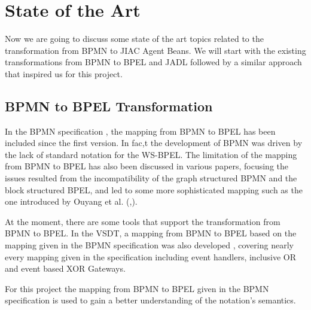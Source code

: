 \chapter{State of the Art}
\label{chap:sota}
Now we are going to discuss some state of the art topics related to the transformation from BPMN to JIAC Agent Beans. We will start with the existing transformations from BPMN to BPEL and JADL followed by a similar approach that inspired us for this project.
\section{BPMN to BPEL Transformation}
In the BPMN specification \cite{BPMN2}, the mapping from BPMN to BPEL has been included since the first version. In fac,t the development of BPMN was driven by the lack of standard notation for the WS-BPEL\cite{weidlich2008}. The limitation of the mapping from BPMN to BPEL has also been discussed in various papers, focusing the issues resulted from the incompatibility of the graph structured BPMN and the block structured BPEL, and led to some more sophisticated mapping such as the one introduced by Ouyang et al. (\cite{Ouyang2006a},\cite{Ouyang2006b}).

At the moment, there are some tools that support the transformation from BPMN to BPEL. 
In the VSDT, a mapping from BPMN to BPEL based on the mapping given in the BPMN specification was also developed \cite{TK07}, covering nearly every mapping given in the specification including event handlers, inclusive OR and event based XOR Gateways. 

For this project the mapping from BPMN to BPEL given in the BPMN specification is used to gain a better understanding of the notation's semantics.


